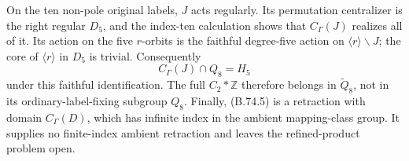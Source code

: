 On the ten non-pole original labels, \(J\) acts regularly.
Its permutation centralizer is the right regular \(D_5\),
and the index-ten calculation shows that
\(C_\Gamma(J)\) realizes all of it.
Its action on the five \(r\)-orbits is the faithful
degree-five action on \(\langle r\rangle\backslash J\);
the core of \(\langle r\rangle\) in \(D_5\) is trivial.
Consequently
\[
       C_\Gamma(J)\cap Q_8=H_5
\]
under this faithful identification.
The full \(C_2*\mathbb Z\) therefore belongs in
\(\widetilde Q_8\), not in its ordinary-label-fixing
subgroup \(Q_8\).
Finally, (B.74.5) is a retraction with domain
\(C_\Gamma(D)\), which has infinite index in the
ambient mapping-class group.  It supplies no
finite-index ambient retraction and leaves the
refined-product problem open.

